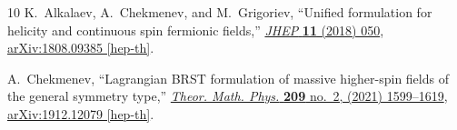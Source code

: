 \documentclass[a4paper,12pt]{article}
\numberwithin{equation}{section} %
\numberwithin{equation}{section}
\begin{document}
\begin{thebibliography}{10}
K.~Alkalaev, A.~Chekmenev, and M.~Grigoriev, ``{Unified formulation for helicity and continuous spin fermionic fields},'' \href{http://dx.doi.org/10.1007/JHEP11(2018)050}{{\em JHEP} {\bfseries 11} (2018) 050},
\href{http://arxiv.org/abs/1808.09385}{{\ttfamily arXiv:1808.09385 [hep-th]}}.

A.~Chekmenev, ``Lagrangian {BRST} formulation of massive higher-spin fields of the general symmetry type,'' \href{http://dx.doi.org/10.1134/S0040577921110076}{{\em Theor. Math. Phys.} {\bfseries 209} no.~2, (2021) 1599--1619}, \href{http://arxiv.org/abs/1912.12079}{{\ttfamily arXiv:1912.12079 [hep-th]}}.

\end{thebibliography}\endgroup
\end{document}
